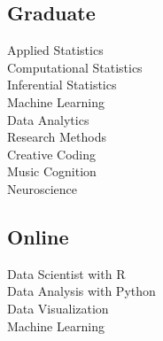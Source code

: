 \documentclass[]{deedy-resume-openfont}
\begin{document}
\begin{minipage}[t]{0.33\textwidth}
\subsection{Graduate}
Applied Statistics \\
Computational Statistics \\
Inferential Statistics \\
Machine Learning \\
Data Analytics \\
Research Methods \\
Creative Coding \\
Music Cognition \\
Neuroscience
\sectionsep


\subsection{Online}
Data Scientist with R \\
Data Analysis with Python \\
Data Visualization \\
Machine Learning


\end{minipage} 
\hfill
\end{document}
